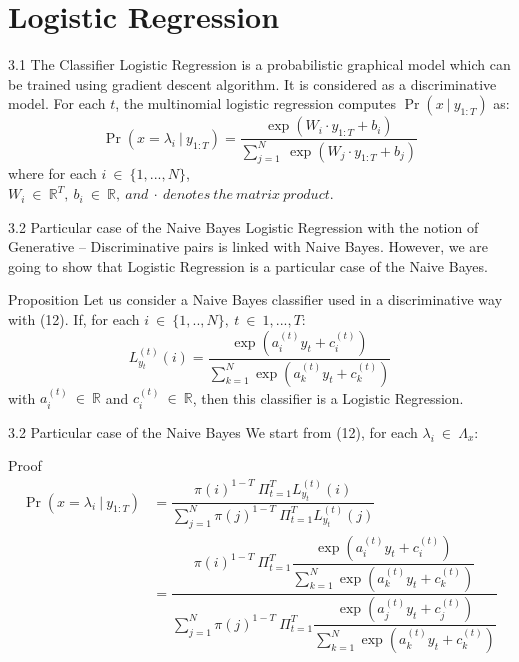 \documentclass{beamer}
\providecommand{\pr}[1]{\ensuremath{\Pr\left(#1\right)}}
\begin{document}
\section{Logistic Regression}

\begin{frame}{3.1 The Classifier}
    Logistic Regression is a probabilistic graphical model which can be trained using gradient descent algorithm. It is considered as a discriminative model. For each $t$, the multinomial logistic regression computes $\pr{x\ |\ y_{1:T}}$ as:
    \begin{equation}
        \pr{x=\lambda_i\ |\ y_{1:T}} = \dfrac{\exp{(W_i \cdot y_{1:T} + b_i)}}{\sum_{j=1}^{N}\ \exp{(W_j \cdot y_{1:T} + b_j)}}
    \end{equation}
    where for each $i\ \in\ \{1,...,N\}$,\\$W_i\ \in\ \mathbb{R}^T,\ b_i\ \in\ \mathbb{R},\ and\ \cdot\ denotes\ the\ matrix\ product.$
\end{frame}

\begin{frame}{3.2 Particular case of the Naive Bayes}
    Logistic Regression with the notion of Generative – Discriminative pairs is linked with Naive Bayes. However, we are going to show that Logistic Regression is a particular case of the Naive Bayes.\\
    \begin{block}{Proposition}
        Let us consider a Naive Bayes classifier used in a discriminative way with (12). If, for each $i\ \in\ \{1,..,N\},\ t\ \in\ 1,...,T$:
            \begin{equation}
                L_{y_t}^{(t)}(i) = \dfrac{\exp{(a_i^{(t)}y_t + c_i^{(t)})}}{\sum_{k=1}^{N}\exp{(a_k^{(t)}y_t + c_k^{(t)})}}
            \end{equation}
        with $a_i^{(t)}\ \in\ \mathbb{R}$ and $c_i^{(t)}\ \in\ \mathbb{R}$, then this classifier is a Logistic Regression.
    \end{block}
\end{frame}

\begin{frame}{3.2 Particular case of the Naive Bayes}
    We start from (12), for each $\lambda_i\ \in\ \Lambda_x$:
    \begin{block}{Proof}
    \begin{equation}
        \begin{split}
            \pr{x=\lambda_i\ |\ y_{1:T}} &= \dfrac{\pi(i)^{1-T}\ \Pi_{t=1}^{T}L_{y_t}^{(t)}(i)}{\sum_{j=1}^{N}\pi(j)^{1-T}\ \Pi_{t=1}^{T}L_{y_t}^{(t)}(j)}\\
             &= \dfrac{\pi(i)^{1-T}\ \Pi_{t=1}^{T} \dfrac{\exp{(a_i^{(t)}y_t + c_i^{(t)})}}{\sum_{k=1}^{N}\exp{(a_k^{(t)}y_t + c_k^{(t)})}}}{\sum_{j=1}^{N}\pi(j)^{1-T}\ \Pi_{t=1}^{T}\dfrac{\exp{(a_j^{(t)}y_t + c_j^{(t)})}}{\sum_{k=1}^{N}\exp{(a_k^{(t)}y_t + c_k^{(t)})}}}\\
        \end{split}
    \end{equation}
    \end{block}
\end{frame}
\end{document}

